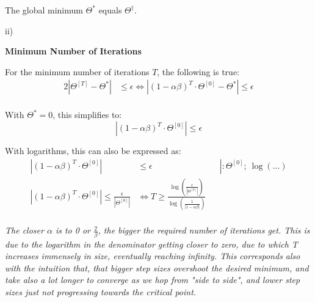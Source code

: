 \begin{answer}
The global minimum \(\Theta^*\) equals \(\Theta^\dagger\).

\vspace{1em}
ii)


\textbf{Minimum Number of Iterations}

For the minimum number of iterations \(T\), the following is true:
\begin{alignat*}{2}
    |\Theta^{[T]} - \Theta^*| &\le \epsilon \iff |(1-\alpha\beta)^T \cdot \Theta^{[0]} - \Theta^*| \le \epsilon\\
  \end{alignat*}

With \(\Theta^*=0\), this simplifies to:
\[
|(1-\alpha\beta)^T \cdot \Theta^{[0]}| \le \epsilon
\]

With logarithms, this can also be expressed as:
\begin{align*}
    |(1-\alpha\beta)^T \cdot \Theta^{[0]}| &\le \epsilon &&\left| : \Theta^{[0]}; \ \log(...)\right.\\
    |(1-\alpha\beta)^T \cdot \Theta^{[0]}| \le \frac{\epsilon}{|\Theta^{[0]}|} &\iff T \ge \frac{\log(\frac{\epsilon}{|\Theta^{[0]}|})}{\log(\frac{1}{|1-\alpha\beta|})} \\
\end{align*}

\vspace{1em}
\textit{The closer $\alpha$ is to 0 or $\frac{2}{\beta}$, the bigger the required number of iterations get. This is due to the logarithm in the denominator getting closer to zero, due to which T increases immensely in size, eventually reaching infinity. This corresponds also with the intuition that, that bigger step sizes overshoot the desired minimum, and take also a lot longer to converge as we hop from "side to side", and lower step sizes just not progressing towards the critical point.}

\end{answer}

